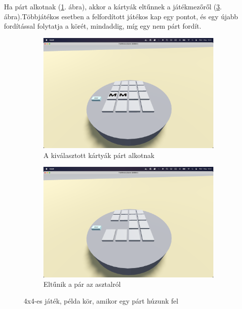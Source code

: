 Ha párt alkotnak (\ref{img:pair}. ábra), akkor a kártyák eltűnnek a játékmezőről  (\ref{img:pair_gone}. ábra).Többjátékos esetben a felfordított játékos kap egy pontot, és egy újabb fordítással folytatja a körét, mindaddig, míg egy nem párt fordít.
\begin{figure}[H]
    \begin{subfigure}[ct]{0.5\textwidth}
        \includegraphics[width=\textwidth]{img/asztal_4x4_pair.png}
        \caption{A kiválasztott kártyák párt alkotnak}
        \label{img:pair}
    \end{subfigure}
    \begin{subfigure}[ct]{0.5\textwidth}
        \includegraphics[width=\textwidth]{img/asztal_4x4_pair_eltunik.png}
        \caption{Eltűnik a pár az asztalról}
        \label{img:pair_gone}
    \end{subfigure}
    \caption{4x4-es játék, példa kör, amikor egy párt húzunk fel}
\end{figure}


